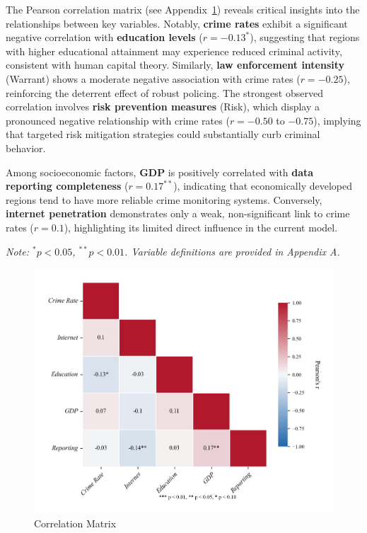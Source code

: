         The Pearson correlation matrix (see Appendix~\ref{fig:correlation-matrix}) reveals critical insights into the relationships between key variables.
        Notably, \textbf{crime rates} exhibit a significant negative correlation with \textbf{education levels} (\(r = -0.13^*\)),
        suggesting that regions with higher educational attainment may experience reduced criminal activity, consistent with human capital theory.
        Similarly, \textbf{law enforcement intensity} (Warrant) shows a moderate negative association with crime rates (\(r = -0.25\)),
        reinforcing the deterrent effect of robust policing.
        The strongest observed correlation involves \textbf{risk prevention measures} (Risk),
        which display a pronounced negative relationship with crime rates (\(r = -0.50\) to \(-0.75\)),
        implying that targeted risk mitigation strategies could substantially curb criminal behavior.

        Among socioeconomic factors, \textbf{GDP} is positively correlated with \textbf{data reporting completeness} (\(r = 0.17^{**}\)),
        indicating that economically developed regions tend to have more reliable crime monitoring systems.
        Conversely, \textbf{internet penetration} demonstrates only a weak, non-significant link to crime rates (\(r = 0.1\)),
        highlighting its limited direct influence in the current model.

        \noindent \textit{Note: \(^*p < 0.05\), \(^{**}p < 0.01\). Variable definitions are provided in Appendix A.}

        \begin{figure}
            \centering
            \includegraphics[width=0.75\linewidth]{../rsrc/demographics/correlation_matrix}
            \caption{Correlation Matrix}\label{fig:correlation-matrix}
        \end{figure}
